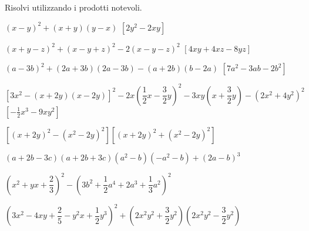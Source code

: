 \begin{esercizio}[\Ast]
 \label{ese:11.33}
Risolvi utilizzando i prodotti notevoli.
 \begin{enumeratea}
 \item $(x-y)^{2}+(x+y)(y-x)$
  \hfill $\left[2y^{2}-2xy\right]$
 \item $(x+y-z)^2+(x-y+z)^2-2(x-y-z)^2$
  \hfill $\left[4xy+4xz-8yz\right]$
 \item $(a-3b)^{2}+(2a+3b)(2a-3b)-(a+2b)(b-2a)$
  \hfill $\left[7a^2-3ab-2b^2\right]$
 \item 
$\left[3x^{2}-(x+2y)(x-2y)\right]^{2}-2x\left(\dfrac{1}{2}x-\dfrac{3}{2}
y\right)^{2}-3{xy}\left(x+\dfrac{3}{2}y\right)-\left(2x^{2}+4y^{2}\right)^{2}$
  \hfill $\left[-\frac{1}{2}x^{3}-9xy^{2}\right]$
 \item 
$\left[\left(x+2y\right)^{2}-\left(x^{2}-2y\right)^{2}\right]\left[
\left(x+2y\right)^{2}+\left(x^{2}-2y\right)^{2}\right]$
 \item $(a+2b-3c)(a+2b+3c)\left(a^{2}-b\right)\left(-a^{2}-b\right)+(2a-b)^{3}$
 \item 
$\left(x^{2}+yx+\dfrac{2}{3}\right)^{2}-\left(3b^{2}+\dfrac{1}{2}a^{4}+2a^{3}
+\dfrac{1}{3}a^{2}\right)^{2}$
 \item 
$\left(3x^{2}-4{xy}+\dfrac{2}{5}-y^{2}x+\dfrac{1}{2}y^{3}\right)^{2}+\left(2x^{2
}y^{2}+\dfrac{3}{2}y^{2}\right)\left(2x^{2}y^{2}-\dfrac{3}{2}y^{2}\right)$
 \end{enumeratea}
\end{esercizio}


